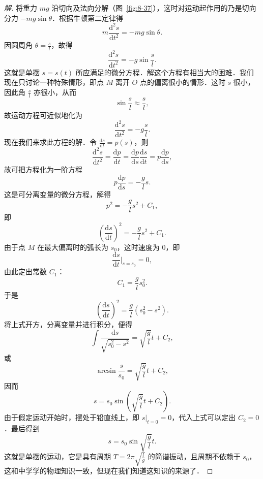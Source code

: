 \begin{proof}[解]
将重力 $mg$ 沿切向及法向分解（图~\ref{fig:8-37}），这时对运动起作用的乃是切向分力 $-mg\sin\theta$．根据牛顿第二定律得
\[
m\frac{\mathrm{d}^2 s}{\mathrm{d}t^2} = -mg\sin\theta.
\]
因圆周角 $\theta = \frac{s}{l}$，故得
\[
\frac{\mathrm{d}^2 s}{\mathrm{d}t^2} = -g\sin\frac{s}{l}.
\]
这就是单摆 $s = s(t)$ 所应满足的微分方程．解这个方程有相当大的困难．我们现在只讨论一种特殊情形，即点 $M$ 离开 $O$ 点的偏离很小的情形．这时 $s$ 很小，因此角 $\frac{s}{l}$ 亦很小，从而
\[
\sin\frac{s}{l} \approx \frac{s}{l},
\]
故运动方程可近似地化为
\[
\frac{\mathrm{d}^2 s}{\mathrm{d}t^2} = -g\frac{s}{l}.
\]
现在我们来求此方程的解．令 $\frac{\mathrm{d}s}{\mathrm{d}t} = p(s)$，则
\[
\frac{\mathrm{d}^2 s}{\mathrm{d}t^2} = \frac{\mathrm{d}p}{\mathrm{d}t} = \frac{\mathrm{d}p}{\mathrm{d}s}\frac{\mathrm{d}s}{\mathrm{d}t} = p\frac{\mathrm{d}p}{\mathrm{d}s},
\]
故可把方程化为一阶方程
\[
p\frac{\mathrm{d}p}{\mathrm{d}s} = -\frac{g}{l}s.
\]
这是可分离变量的微分方程，解得
\[
p^2 = -\frac{g}{l}s^2 + C_1,
\]
即
\[
\left(\frac{\mathrm{d}s}{\mathrm{d}t}\right)^2 = -\frac{g}{l}s^2 + C_1.
\]
由于点 $M$ 在最大偏离时的弧长为 $s_0$，这时速度为 $0$，即
\[
\frac{\mathrm{d}s}{\mathrm{d}t}\Bigg|_{s=s_0} = 0,
\]
由此定出常数 $C_1$：
\[
C_1 = \frac{g}{l}s_0^2.
\]
于是
\[
\left(\frac{\mathrm{d}s}{\mathrm{d}t}\right)^2 = \frac{g}{l}(s_0^2 - s^2).
\]
将上式开方，分离变量并进行积分，便得
\[
\int \frac{\mathrm{d}s}{\sqrt{s_0^2 - s^2}} = \sqrt{\frac{g}{l}}t + C_2,
\]
或
\[
\arcsin\frac{s}{s_0} = \sqrt{\frac{g}{l}}t + C_2,
\]
因而
\[
s = s_0 \sin\left(\sqrt{\frac{g}{l}}t + C_2\right).
\]
由于假定运动开始时，摆处于铅直线上，即 $s\big|_{t=0} = 0$，代入上式可以定出 $C_2 = 0$．最后得到
\[
s = s_0 \sin\sqrt{\frac{g}{l}}t.
\]
这就是单摆的运动，它是具有周期 $T = 2\pi\sqrt{\frac{l}{g}}$ 的简谐振动，且周期不依赖于 $s_0$，这和中学学的物理知识一致，但现在我们知道这知识的来源了．
\end{proof}


